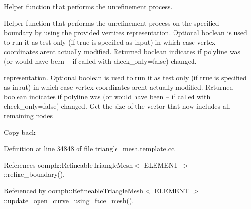 Helper function that performs the unrefinement process. 

Helper function that performs the unrefinement process on the specified boundary by using the provided vertices representation. Optional boolean is used to run it as test only (if true is specified as input) in which case vertex coordinates aren\textquotesingle{}t actually modified. Returned boolean indicates if polyline was (or would have been -- if called with check\+\_\+only=false) changed.

representation. Optional boolean is used to run it as test only (if true is specified as input) in which case vertex coordinates aren\textquotesingle{}t actually modified. Returned boolean indicates if polyline was (or would have been -- if called with check\+\_\+only=false) changed. Get the size of the vector that now includes all remaining nodes

Copy back 

Definition at line 34848 of file triangle\+\_\+mesh.\+template.\+cc.



References oomph\+::\+Refineable\+Triangle\+Mesh$<$ E\+L\+E\+M\+E\+N\+T $>$\+::refine\+\_\+boundary().



Referenced by oomph\+::\+Refineable\+Triangle\+Mesh$<$ E\+L\+E\+M\+E\+N\+T $>$\+::update\+\_\+open\+\_\+curve\+\_\+using\+\_\+face\+\_\+mesh().

\mbox{\label{classoomph_1_1RefineableTriangleMesh_ad06aa82d81a16d5948b4317608a67aae}} 
